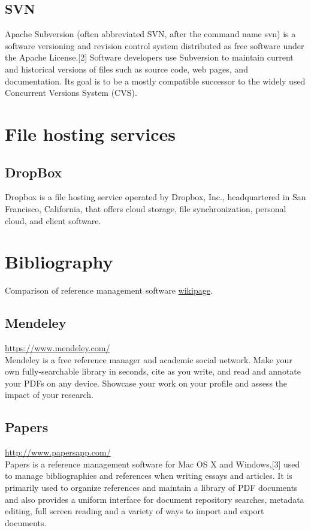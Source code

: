 \documentclass{article}
\begin{document}
\subsection{SVN}
Apache Subversion (often abbreviated SVN, after the command name svn) is a software versioning and revision control system distributed as free software under the Apache License.[2] Software developers use Subversion to maintain current and historical versions of files such as source code, web pages, and documentation. Its goal is to be a mostly compatible successor to the widely used Concurrent Versions System (CVS).

\section{File hosting services}
\subsection{DropBox}
Dropbox is a file hosting service operated by Dropbox, Inc., headquartered in San Francisco, California, that offers cloud storage, file synchronization, personal cloud, and client software.

\section{Bibliography}
Comparison of reference management software \href{https://en.wikipedia.org/wiki/Comparison_of_reference_management_software}{wikipage}. 

\subsection{Mendeley}
\href{https://www.mendeley.com/}{https://www.mendeley.com/}\\
Mendeley is a free reference manager and academic social network. Make your own fully-searchable library in seconds, cite as you write, and read and annotate your PDFs on any device. Showcase your work on your profile and assess the impact of your research. 

\subsection{Papers}
\href{http://www.papersapp.com/}{http://www.papersapp.com/}\\
Papers is a reference management software for Mac OS X and Windows,[3] used to manage bibliographies and references when writing essays and articles. It is primarily used to organize references and maintain a library of PDF documents and also provides a uniform interface for document repository searches, metadata editing, full screen reading and a variety of ways to import and export documents.
\end{document}
